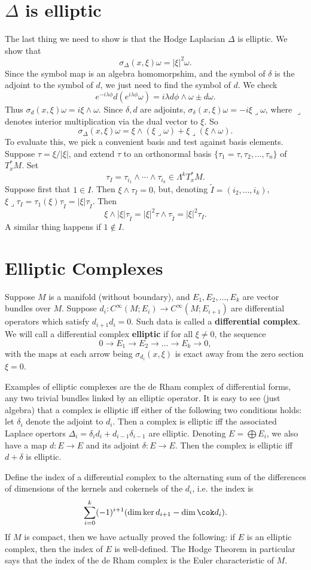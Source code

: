 \documentclass[12pt]{article}
\begin{document}
\section{$\Delta$ is elliptic}
The last thing we need to show is that the Hodge Laplacian $\Delta$ is elliptic. We show that \[\sigma_{\Delta}(x,\xi)\omega = |\xi|^2\omega.\] Since the symbol map is an algebra homomorpshim, and the symbol of $\delta$ is the adjoint to the symbol of $d$, we just need to find the symbol of $d$. We check
\[e^{-i\lambda\phi}d(e^{i\lambda \phi}\omega) = i\lambda d\phi\wedge \omega \pm d\omega.\] Thus $\sigma_{d}(x,\xi)\omega = i\xi\wedge \omega$. Since $\delta,d$ are adjoints, $\sigma_{\delta}(x,\xi)\omega = -i\xi\lrcorner \omega$, where $\lrcorner$ denotes interior multiplication via the dual vector to $\xi$. So
\[\sigma_{\Delta}(x,\xi)\omega = \xi\wedge(\xi \lrcorner \omega) + \xi\lrcorner(\xi \wedge \omega).\] To evaluate this, we pick a convenient basis and test against basis elements. Suppose $\tau = \xi/|\xi|$, and extend $\tau$ to an orthonormal basis $\{\tau_1 = \tau,\tau_2,\ldots,\tau_n\}$ of $T^\ast_xM$. Set
\[\tau_I = \tau_{i_1}\wedge\cdots\wedge\tau_{i_k}\in \Lambda^kT^\ast_x M.\] Suppose first that $1 \in I$. Then $\xi \wedge \tau_I = 0$, but, denoting $\tilde{I} = (i_2,\ldots,i_k)$, $\xi \lrcorner \tau_I = \tau_1(\xi)\tau_{\tilde I} = |\xi|\tau_{\tilde{I}}$. Then 
\[\xi \wedge |\xi|\tau_{\tilde{I}} = |\xi|^2\tau\wedge\tau_{\tilde{I}} = |\xi|^2\tau_I.\] A similar thing happens if $1 \not \in I$.

\section{Elliptic Complexes}
Suppose $M$ is a manifold (without boundary), and $E_1,E_2,\ldots,E_k$ are vector bundles over $M$. Suppose $d_i:C^\infty(M;E_i) \to C^\infty(M;E_{i+1})$ are differential operators which satisfy $d_{i+1}d_i = 0$. Such data is called a \textbf{differential complex}. We will call a differential complex \textbf{elliptic} if for all $\xi \neq 0$, the sequence
\[0\to E_1 \to E_2 \to \ldots \to E_k \to 0,\] with the maps at each arrow being $\sigma_{d_i}(x,\xi)$ is exact away from the zero section $\xi = 0$.

Examples of elliptic complexes are the de Rham complex of differential forms, any two trivial bundles linked by an elliptic operator. It is easy to see (just algebra) that a complex is elliptic iff either of the following two conditions holds: let $\delta_i$ denote the adjoint to $d_i$. Then a complex is elliptic iff the associated Laplace opertors $\Delta_i = \delta_id_{i} + d_{i-1}\delta_{i-1}$ are elliptic. Denoting $E = \bigoplus E_i$, we also have a map $d:E\to E$ and its adjoint $\delta: E\to E$. Then the complex is elliptic iff $d+\delta$ is elliptic.

Define the index of a differential complex to the alternating sum of the differences of dimensions of the kernels and cokernels of the $d_i$, i.e. the index is
\[\sum_{i=0}^{k} (-1)^{i+1}(\dim \ker d_{i+1}-\dim \cok d_{i}).\] If $M$ is compact, then we have actually proved the following: if $E$ is an elliptic complex, then the index of $E$ is well-defined. The Hodge Theorem in particular says that the index of the de Rham complex is the Euler characteristic of $M$.
\end{document}

